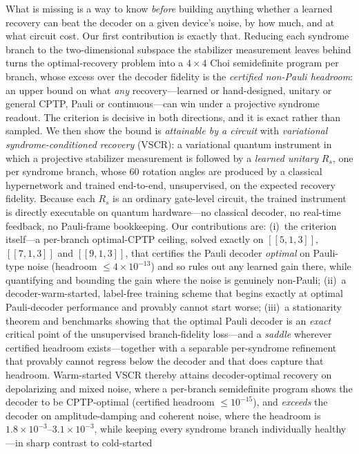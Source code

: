 \documentclass[aps,prxquantum,reprint,superscriptaddress]{revtex4-2}
\begin{document}
What is missing is a way to know \emph{before} building anything whether a learned
recovery can beat the decoder on a given device's noise, by how much, and at what
circuit cost. Our first contribution is exactly that. Reducing each syndrome branch
to the two-dimensional subspace the stabilizer measurement leaves behind turns the
optimal-recovery problem into a $4\times4$ Choi semidefinite program per branch,
whose excess over the decoder fidelity is the \emph{certified non-Pauli headroom}:
an upper bound on what \emph{any} recovery---learned or hand-designed, unitary or
general CPTP, Pauli or continuous---can win under a projective syndrome readout.
The criterion is decisive in both directions, and it is exact rather than sampled.
We then show the bound is \emph{attainable by a circuit} with \emph{variational
syndrome-conditioned recovery} (VSCR): a variational quantum instrument in which a
projective stabilizer measurement is followed by a \emph{learned unitary} $R_s$, one
per syndrome branch, whose $60$ rotation angles are produced by a classical
hypernetwork and trained end-to-end, unsupervised, on the expected recovery
fidelity. Because each $R_s$ is an ordinary gate-level circuit, the trained
instrument is directly executable on quantum hardware---no classical decoder, no
real-time feedback, no Pauli-frame bookkeeping. Our contributions are:
(i)~the criterion itself---a per-branch optimal-CPTP ceiling, solved exactly on
$[\![5,1,3]\!]$, $[\![7,1,3]\!]$ and $[\![9,1,3]\!]$, that certifies the Pauli
decoder \emph{optimal} on Pauli-type noise (headroom $\le4\times10^{-13}$) and so
rules out any learned gain there, while quantifying and bounding the gain where the
noise is genuinely non-Pauli;
(ii)~a decoder-warm-started, label-free training scheme that begins exactly at
optimal Pauli-decoder performance and provably cannot start worse;
(iii)~a stationarity theorem and benchmarks showing that the optimal Pauli
decoder is an \emph{exact} critical point of the unsupervised branch-fidelity
loss---and a \emph{saddle} wherever certified headroom exists---together with a
separable per-syndrome refinement that provably cannot regress below the decoder
and that does capture that headroom. Warm-started VSCR thereby attains
decoder-optimal recovery on depolarizing and mixed noise, where a per-branch
semidefinite program shows the decoder to be CPTP-optimal (certified headroom
$\le10^{-15}$), and \emph{exceeds} the decoder on amplitude-damping and coherent
noise, where the headroom is $1.8\times10^{-3}$--$3.1\times10^{-3}$, while keeping
every syndrome branch individually healthy---in sharp contrast to cold-started
\end{document}
